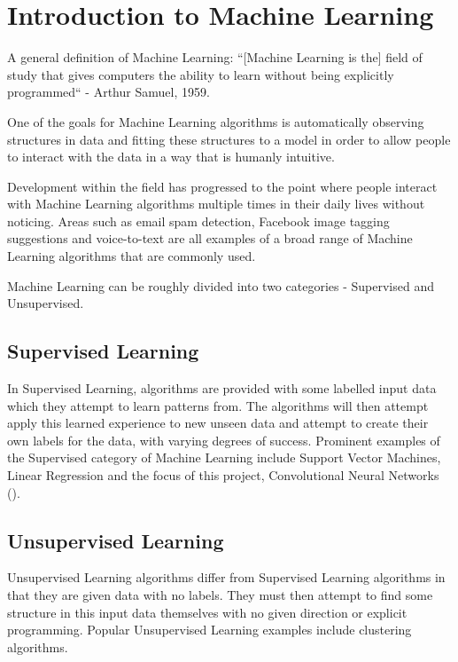 \documentclass[12pt]{report}
\begin{document}
\section{Introduction to Machine Learning}
\begin{flushleft}
A general definition of Machine Learning:
``[Machine Learning is the] field of study that gives computers the ability to learn without being explicitly programmed`` - Arthur Samuel, 1959.

One of the goals for Machine Learning algorithms is automatically observing structures in data and fitting these structures to a model in order to allow people to interact with the data in a way that is humanly intuitive.

Development within the field has progressed to the point where people interact with Machine Learning algorithms multiple times in their daily lives without noticing. Areas such as email spam detection, Facebook image tagging suggestions and voice-to-text are all examples of a broad range of Machine Learning algorithms that are commonly used.

Machine Learning can be roughly divided into two categories - Supervised and Unsupervised. 
\end{flushleft}

\subsection{Supervised Learning}
\begin{flushleft}
In Supervised Learning, algorithms are provided with some labelled input data which they attempt to learn patterns from. The algorithms will then attempt apply this learned experience to new unseen data and attempt to create their own labels for the data, with varying degrees of success. Prominent examples of the Supervised category of Machine Learning include Support Vector Machines, Linear Regression and the focus of this project, Convolutional Neural Networks (\cite{o2015introduction}).
\end{flushleft}

\subsection{Unsupervised Learning}
\begin{flushleft}
Unsupervised Learning algorithms differ from Supervised Learning algorithms in that they are given data with no labels. They must then attempt to find some structure in this input data themselves with no given direction or explicit programming. Popular Unsupervised Learning examples include clustering algorithms.
\end{flushleft}
\end{document}
